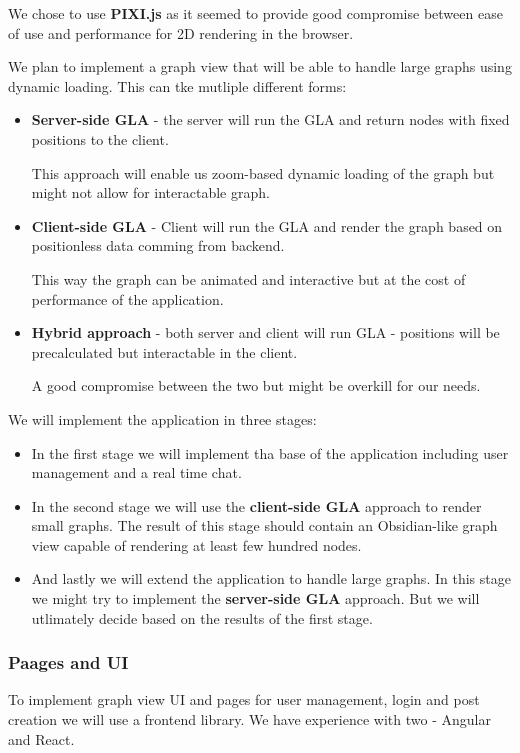 We chose to use \textbf{PIXI.js} as it seemed to provide good compromise between ease of use and performance for 2D rendering in the browser.

We plan to implement a graph view that will be able to handle large graphs using dynamic loading.
This can tke mutliple different forms:
\begin{itemize}
    \item \textbf{Server-side GLA} - the server will run the GLA and return nodes with fixed positions to the client.

    This approach will enable us zoom-based dynamic loading of the graph but might not allow for interactable graph.
    \item \textbf{Client-side GLA} - Client will run the GLA and render the graph based on positionless data comming from backend.

    This way the graph can be animated and interactive but at the cost of performance of the application.
    \item \textbf{Hybrid approach} - both server and client will run GLA - positions will be precalculated but interactable in the client.

    A good compromise between the two but might be overkill for our needs.
\end{itemize}

We will implement the application in three stages:
\begin{itemize}
    \item In the first stage we will implement tha base of the application including user management and a real time chat.

    \item In the second stage we will use the \textbf{client-side GLA} approach to render small graphs. 
    The result of this stage should contain an Obsidian-like graph view capable of rendering at least few hundred nodes.

    \item And lastly we will extend the application to handle large graphs.
    In this stage we might try to implement the \textbf{server-side GLA} approach.
    But we will utlimately decide based on the results of the first stage.
\end{itemize}

\subsubsection{Paages and UI}
To implement graph view UI and pages for user management, login and post creation we will use a frontend library.
We have experience with two - Angular and React.

